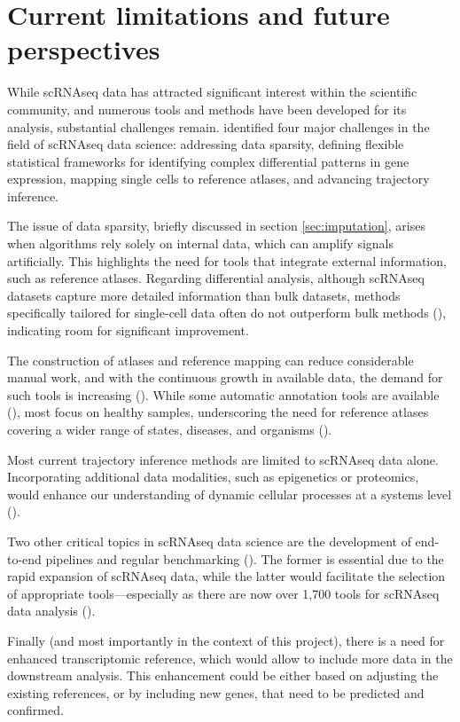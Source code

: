 \section{Current limitations and future perspectives}

While scRNAseq data has attracted significant interest within the scientific community,
and numerous tools and methods have been developed for its analysis, substantial challenges remain.
\textcite{Lahnemann2020} identified four major challenges in the field of scRNAseq data science:
addressing data sparsity, defining flexible statistical frameworks for identifying complex differential patterns in gene expression,
mapping single cells to reference atlases, and advancing trajectory inference.

The issue of data sparsity, briefly discussed in section \ref{sec:imputation}, arises when algorithms rely solely on internal data,
which can amplify signals artificially.
This highlights the need for tools that integrate external information, such as reference atlases.
Regarding differential analysis, although scRNAseq datasets capture more detailed information than bulk datasets,
methods specifically tailored for single-cell data often do not outperform bulk methods (\cite{Soneson2017}),
indicating room for significant improvement.

The construction of atlases and reference mapping can reduce considerable manual work, and with the continuous growth in available data,
the demand for such tools is increasing (\cite{Heumos2023}).
While some automatic annotation tools are available (\cite{Dom2022}), most focus on healthy samples,
underscoring the need for reference atlases covering a wider range of states, diseases, and organisms (\cite{Heumos2023}).

Most current trajectory inference methods are limited to scRNAseq data alone.
Incorporating additional data modalities, such as epigenetics or proteomics,
would enhance our understanding of dynamic cellular processes at a systems level (\cite{Lahnemann2020}).

Two other critical topics in scRNAseq data science are the development of end-to-end pipelines and regular benchmarking (\cite{Heumos2023}).
The former is essential due to the rapid expansion of scRNAseq data, while the latter would facilitate
the selection of appropriate tools—especially as there are now over 1,700 tools for scRNAseq data analysis (\cite{scrnatools}).

Finally (and most importantly in the context of this project), there is a need for enhanced transcriptomic reference,
which would allow to include more data in the downstream analysis.
This enhancement could be either based on adjusting the existing references, or by including new genes,
that need to be predicted and confirmed.
\fi
